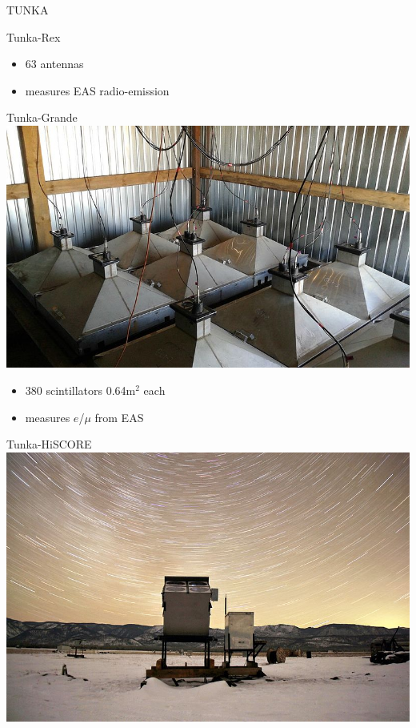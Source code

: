 \documentclass[18pt]{beamer}
\begin{document}
\begin{frame}{TUNKA}
\begin{minipage}[t]{0.48\textwidth}
\begin{block}{Tunka-Rex}
    \begin{itemize}
      \setlength{\itemsep}{0pt}
      \item 63 antennas
      \item measures EAS radio-emission
    \end{itemize}
  \end{block}
\end{minipage}

\vspace{-1ex}
\begin{minipage}[t]{0.48\textwidth}
  \begin{block}{Tunka-Grande}
    \centering
    \includegraphics[height=0.23\textheight]{pics/Hiller_Roman-005.jpg}\vspace{-2ex}

    \begin{itemize}
      \setlength{\itemsep}{0pt}
      \item 380 scintillators 0.64m$^2$ each
      \item measures $e$/$\mu$ from EAS
    \end{itemize}
  \end{block}
\end{minipage}
\hfill
\begin{minipage}[t]{0.48\textwidth}
  \begin{block}{Tunka-HiSCORE}
    \centering
    \includegraphics[height=0.23\textheight]{pics/Tunka-HiSCORE.jpg}\vspace{-2ex}


\end{block}
\end{minipage}
\end{frame}
\end{document}
